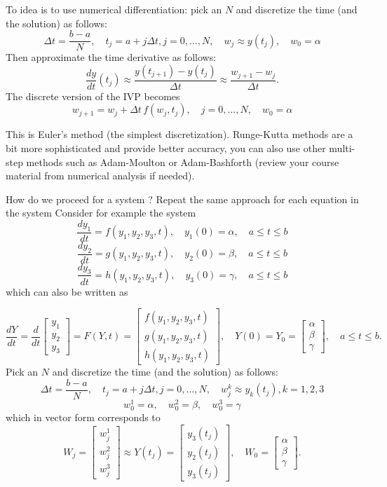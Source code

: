 To idea is to use numerical differentiation: pick an $N$ and discretize the time (and the solution) as follows:
\[ \Delta t = \frac{b-a}{N}, \quad t_j = a + j \Delta t, j = 0,...,N, \quad w_j \approx y(t_j), \quad w_0 = \alpha \]
Then approximate the time derivative as follows:
\[ \displaystyle \frac{d y}{d t}(t_j) \approx \frac{ y(t_{j+1}) - y(t_j)}{\Delta t} \approx \frac{ w_{j+1} - w_j}{\Delta t}.  \] 
The discrete version of the IVP becomes 
\[  w_{j+1} = w_j + \Delta t \, f(w_j, t_j),\quad  j = 0, ...,N, \quad w_0 = \alpha \]

This is Euler's method (the simplest discretization). Runge-Kutta methods are a bit more sophisticated and provide better accuracy, you can also use other multi-step methods such as Adam-Moulton or Adam-Bashforth (review your course material from numerical analysis if needed).

How do we proceed for a system ? Repeat the same approach for each equation in the system Consider for example the system 
 \[ \displaystyle \frac{d y_1}{d t} = f(y_1,y_2,y_3,t), \quad y_1(0) = \alpha, \quad a \leq t \leq b\]
  \[ \displaystyle \frac{d y_2}{d t} = g(y_1,y_2,y_3,t), \quad y_2(0) = \beta, \quad a \leq t \leq b\]
   \[ \displaystyle \frac{d y_3}{d t} = h(y_1,y_2,y_3,t), \quad y_3(0) = \gamma, \quad a \leq t \leq b\]
 which can also be written as
 
 \[ \displaystyle \frac{d Y}{d t}   = \displaystyle \frac{d }{d t}  \begin{bmatrix}
 y_1 \\y_2 \\ y_3
\end{bmatrix}  = F(Y,t)  =  \begin{bmatrix}
 f(y_1,y_2,y_3,t) \\g(y_1,y_2,y_3,t) \\ h(y_1,y_2,y_3,t)
\end{bmatrix}, \quad Y(0) = Y_0 =   \begin{bmatrix}
\alpha \\ \beta  \\ \gamma
\end{bmatrix} , \quad  a \leq t \leq b. \]
Pick an $N$ and discretize the time (and the solution) as follows:
\[ \Delta t = \frac{b-a}{N}, \quad t_j = a + j \Delta t, j = 0,...,N, \quad w_j^k \approx y_k(t_j), k =1,2,3 \] 
\[w_0^1 = \alpha, \quad w_0^2 = \beta, \quad  w_0^3 = \gamma\]
which in vector form corresponds to
\[  W_j  =   \begin{bmatrix}
 w_j^1 \\ w_j^2 \\ w_j^3
\end{bmatrix} \approx Y(t_j) =   \begin{bmatrix}
 y_3(t_j) \\  y_2(t_j) \\  y_3(t_j)
\end{bmatrix}, \quad W_0 =  \begin{bmatrix}
\alpha \\ \beta  \\ \gamma
\end{bmatrix} .\]

